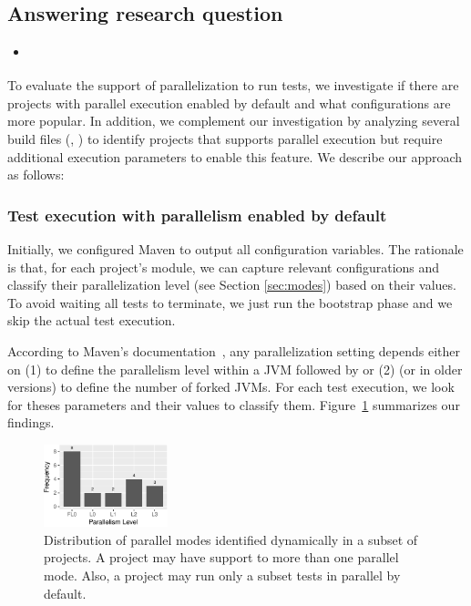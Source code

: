 \subsection{Answering research question \numRQC{}}
\label{sec:rqC}

\begin{itemize}
    \item \emph{\RQC}
\end{itemize}

To evaluate the support of parallelization to run tests, we
investigate if there are projects with parallel execution enabled by
default and what configurations are more popular. In addition, we
complement our investigation by analyzing several build files (\ie,
\pomf{}) to identify projects that supports parallel execution but
require additional execution parameters to enable this feature.  We
describe our approach as follows:

\subsubsection{Test execution with parallelism enabled by default}
\label{sec:rqC-1}

Initially, we configured Maven to output all configuration variables.
The rationale is that, for each project's module, we can capture
relevant configurations and classify their parallelization level (see
Section \ref{sec:modes}) based on their values. To avoid waiting all
tests to terminate, we just run the bootstrap phase and we skip the
actual test execution.

According to Maven's documentation~\cite{maven-surefire-plugin}, any
parallelization setting depends either on (1)  to
define the parallelism level within a JVM followed by
 or (2)  (or 
in older versions) to define the number of forked JVMs. For each test
execution, we look for theses parameters and their values to classify
them.   Figure~\ref{fig:freqmodes-dynamic} summarizes our
findings.

\begin{figure}[h!]
    \centering
    \includegraphics[width=0.32\textwidth]{plots/barplot-modes-dynamic.pdf}
    \caption{\label{fig:freqmodes-dynamic}Distribution of parallel modes identified dynamically in a
    subset of \numProjectsPar{} projects.  A project may have support
    to more than one parallel mode. Also, a project may run only a
    subset tests in parallel by default.}
\end{figure}

